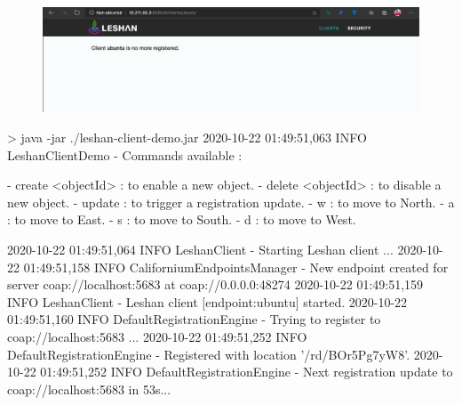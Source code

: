 \begin{figure}[tbp]
\centerline{\includegraphics[width=1\columnwidth]{Pictures/lwm2m-server1.png}}
\label{fig-lwm2m-server1}
\end{figure}



         \vspace{1em}


\begin{termc}[backgroundcolor=\color{purple!30}, basicstyle=\ttfamily\small, escapechar=@] %
> java -jar ./leshan-client-demo.jar
2020-10-22 01:49:51,063 INFO LeshanClientDemo - Commands available :

  - create <objectId> : to enable a new object.
  - delete <objectId> : to disable a new object.
  - update : to trigger a registration update.
  - w : to move to North.
  - a : to move to East.
  - s : to move to South.
  - d : to move to West.

2020-10-22 01:49:51,064 INFO LeshanClient - Starting Leshan client ...
2020-10-22 01:49:51,158 INFO CaliforniumEndpointsManager - New 
endpoint created for server coap://localhost:5683 at 
coap://0.0.0.0:48274
2020-10-22 01:49:51,159 INFO LeshanClient - Leshan client
[endpoint:ubuntu] started.
2020-10-22 01:49:51,160 INFO DefaultRegistrationEngine - Trying to 
register to coap://localhost:5683 ...
2020-10-22 01:49:51,252 INFO DefaultRegistrationEngine - Registered 
with location '/rd/BOr5Pg7yW8'.
2020-10-22 01:49:51,252 INFO DefaultRegistrationEngine - Next 
registration update to coap://localhost:5683 in 53s...
\end{termc}



